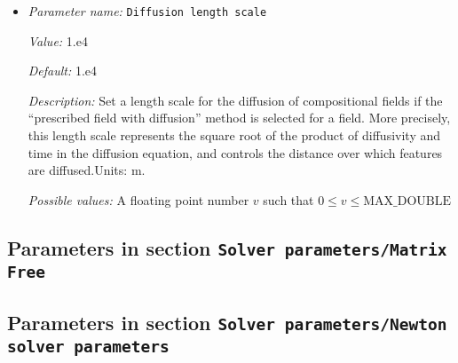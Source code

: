 \begin{itemize}
\item {\it Parameter name:} {\tt Diffusion length scale}
\label{parameters:Solver parameters/Diffusion solver parameters/Diffusion length scale}
\label{parameters:Solver_20parameters/Diffusion_20solver_20parameters/Diffusion_20length_20scale}


{\it Value:} 1.e4


{\it Default:} 1.e4


{\it Description:} Set a length scale for the diffusion of compositional fields if the ``prescribed field with diffusion'' method is selected for a field. More precisely, this length scale represents the square root of the product of diffusivity and time in the diffusion equation, and controls the distance over which features are diffused.Units: m.


{\it Possible values:} A floating point number $v$ such that $0 \leq v \leq \text{MAX\_DOUBLE}$
\end{itemize}

\subsection{Parameters in section \tt Solver parameters/Matrix Free}
\label{parameters:Solver_20parameters/Matrix_20Free}


\subsection{Parameters in section \tt Solver parameters/Newton solver parameters}
\label{parameters:Solver_20parameters/Newton_20solver_20parameters}

